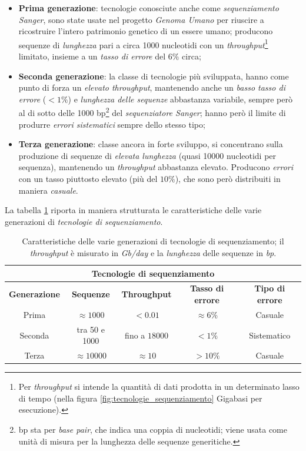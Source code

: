 \begin{itemize}
    \item \textbf{Prima generazione}:
    tecnologie conosciute anche come \emph{sequenziamento  Sanger}, sono state usate nel progetto \emph{Genoma Umano} per riuscire a ricostruire l'intero patrimonio genetico di un essere umano; producono sequenze di \emph{lunghezza} pari a circa 1000 nucleotidi con un \emph{throughput}\footnote{Per \emph{throughput} si intende la quantità di dati prodotta in un determinato lasso di tempo (nella figura \ref{fig:tecnologie_sequenziamento} Gigabasi per esecuzione).} limitato, insieme a un \emph{tasso di errore} del $6\%$ circa;

    \item \textbf{Seconda generazione}:
    la classe di tecnologie più sviluppata, hanno come punto di forza un \emph{elevato throughput}, mantenendo anche un \emph{basso tasso di errore} ($<1\%$) e \emph{lunghezza delle sequenze} abbastanza variabile, sempre però al di sotto delle 1000 bp\footnote{bp sta per \emph{base pair}, che indica una coppia di nucleotidi; viene usata come unità di misura per la lunghezza delle sequenze generitiche.} del \emph{sequenziatore Sanger}; hanno però il limite di produrre \emph{errori sistematici} sempre dello stesso tipo; 

    \item \textbf{Terza generazione}:
    classe ancora in forte sviluppo, si concentrano sulla produzione di sequenze di \emph{elevata lunghezza} (quasi 10000 nucleotidi per sequenza), mantenendo un \emph{throughput} abbastanza elevato. Producono \emph{errori} con un tasso piuttosto elevato (più del $10\%$), che sono però distribuiti in maniera \emph{casuale}. 
\end{itemize}
La tabella \ref{tab:errori_sequenziatori} riporta in maniera strutturata le caratteristiche delle varie generazioni di \emph{tecnologie di sequenziamento}.

\vspace{30pt}
\begin{table}[h]
    \centering
    \begin{tabular}{|c|c|c|c|c|}
        \hline
            \multicolumn{5}{|c|}{\textbf{Tecnologie di sequenziamento}} \\
        \hline
            \textbf{Generazione} & \textbf{Sequenze} & \textbf{Throughput} & \textbf{Tasso di errore} & \textbf{Tipo di errore} \\
        \hline
            Prima & $\approx 1000$ & $< 0.01$ & $\approx 6\%$ & Casuale \\
        \hline
            Seconda & tra 50 e 1000 & fino a $18000$ & $<1\%$ & Sistematico \\
        \hline
            Terza & $\approx 10000$ & $\approx 10$ & $>10\%$ & Casuale \\
        \hline
    \end{tabular}
    \caption{Caratteristiche delle varie generazioni di tecnologie di sequenziamento; il \emph{throughput} è misurato in \emph{Gb/day} e la \emph{lunghezza} delle sequenze in \emph{bp}.}
    \label{tab:errori_sequenziatori}
\end{table}

